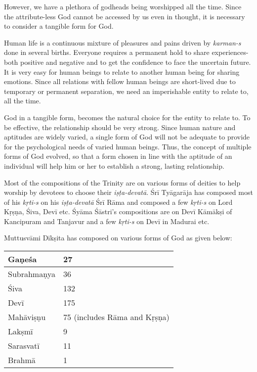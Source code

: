 However, we have a plethora of godheads being worshipped all the time. Since the attribute-less God cannot be accessed by us even in thought, it is necessary to consider a tangible form for God.

Human life is a continuous mixture of pleasures and pains driven by \textit{karman-s} done in several births. Everyone requires a permanent hold to share experiences- both positive and negative and to get the confidence to face the uncertain future. It is very easy for human beings to relate to another human being for sharing emotions. Since all relations with fellow human beings are short-lived due to temporary or permanent separation, we need an imperishable entity to relate to, all the time.

God in a tangible form, becomes the natural choice for the entity to relate to. To be effective, the relationship should be very strong. Since human nature and aptitudes are widely varied, a single form of God will not be adequate to provide for the psychological needs of varied human beings. Thus, the concept of multiple forms of God evolved, so that a form chosen in line with the aptitude of an individual will help him or her to establish a strong, lasting relationship.

Most of the compositions of the Trinity are on various forms of deities to help worship by devotees to choose their \textit{iṣṭa-devatā}. Śrī Tyāgarāja has composed most of his \textit{kṛti-s} on his \textit{iṣṭa-devatā} Śrī Rāma and composed a few \textit{kṛti-s} on Lord Kṛṣṇa, Śiva, Devī etc. Śyāma Śāstri’s compositions are on Devī Kāmākṣi of Kancipuram and Tanjavur and a few \textit{kṛti-s} on Devī in Madurai etc.

Muttusvāmi Dīkṣita has composed on various forms of God as given below:

\begin{longtable}{|l|l|}
\hline
Gaṇeśa & 27 \\
\hline
Subrahmaṇya & 36 \\
\hline
Śiva & 132 \\
\hline
Devī & 175 \\
\hline
Mahāviṣṇu & 75 (includes Rāma and Kṛṣṇa) \\
\hline
Lakṣmī & 9 \\
\hline
Sarasvatī & 11 \\
\hline
Brahmā & 1 \\
\hline
\end{longtable}

